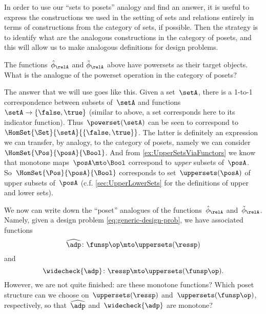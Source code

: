 In order to use our ``sets to posets'' analogy and find an answer, it is useful to express the constructions we used in the setting of sets and relations entirely in terms of constructions from the category of sets, if possible.
Then the strategy is to identify what are the analogous constructions in the category of posets, and this will allow us to make analogous definitions for design problems.

The functions~$\hat \phi_{\relA}$ and $\check \phi_{\relA}$ above have powersets as their target objects. What is the analogue of the powerset operation in the category of posets?

The answer that we will use goes like this.
Given a set~$\setA$, there is a 1-to-1 correspondence between subsets of~$\setA$ and functions~$\setA \to \{ \false, \true \}$ (similar to above, a set corresponds here to its indicator function).
Thus~$\powerset (\setA)$ can be seen to correspond to~$\HomSet{\Set}{\setA}{\{ \false, \true\}}$.
The latter is definitely an expression we can transfer, by analogy, to the category of posets, namely we can consider~$\HomSet{\Pos}{\posA}{\Bool}$.
And from \cref{ex:UpperSetsViaFunctors} we know that monotone maps~$\posA \mto \Bool$ correspond to \emph{upper} subsets of~$\posA$.
So~$\HomSet{\Pos}{\posA}{\Bool}$ corresponds to set~$\uppersets (\posA)$ of upper subsets of~$\posA$ (c.f. \cref{sec:UpperLowerSets} for the definitions of upper and lower sets).

We now can write down the ``poset'' analogues of the functions~$\hat \phi_{\relA}$ and~$\check \phi_{\relA}$.
Namely, given a design problem \cref{eq:generic-design-prob}, we have associated functions
\begin{equation}
    \label{eq:dp-left-curry}
    \widehat{\adp} \colon \funsp\op \mto \uppersets (\ressp)
\end{equation}
and
\begin{equation}
    \label{eq:dp-right-curry}
    \widecheck{\adp} \colon \ressp \mto \uppersets (\funsp\op).
\end{equation}
However, we are not quite finished: are these monotone functions? Which poset structure can we choose on~$\uppersets (\ressp)$ and~$\uppersets (\funsp\op)$,
respectively, so that~$\widehat{\adp}$ and~$\widecheck{\adp}$ are monotone?

